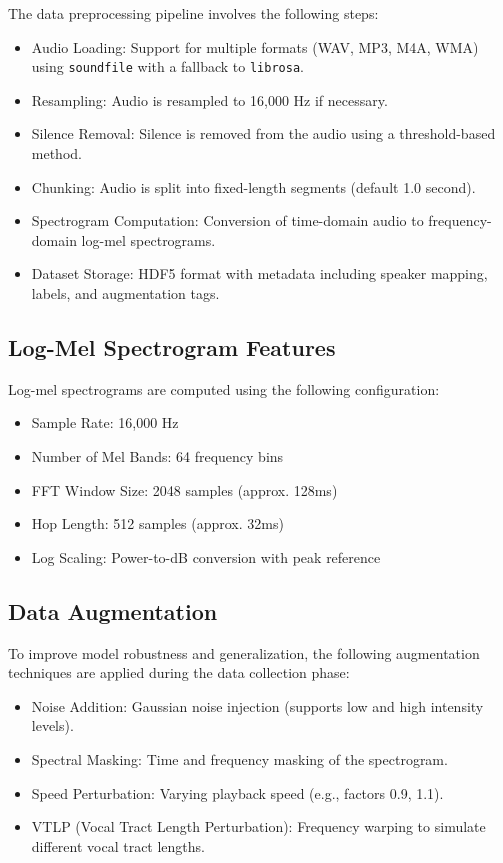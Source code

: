 \documentclass[12pt,a4paper]{article}
\begin{document}
The data preprocessing pipeline involves the following steps:

\begin{itemize}
\item Audio Loading: Support for multiple formats (WAV, MP3, M4A, WMA) using \texttt{soundfile} with a fallback to \texttt{librosa}.
\item Resampling: Audio is resampled to 16,000 Hz if necessary.
\item Silence Removal: Silence is removed from the audio using a threshold-based method.
\item Chunking: Audio is split into fixed-length segments (default 1.0 second).
\item Spectrogram Computation: Conversion of time-domain audio to frequency-domain log-mel spectrograms.
\item Dataset Storage: HDF5 format with metadata including speaker mapping, labels, and augmentation tags.
\end{itemize}

\subsection{Log-Mel Spectrogram Features}

Log-mel spectrograms are computed using the following configuration:
\begin{itemize}
\item Sample Rate: 16,000 Hz
\item Number of Mel Bands: 64 frequency bins
\item FFT Window Size: 2048 samples (approx. 128ms)
\item Hop Length: 512 samples (approx. 32ms)
\item Log Scaling: Power-to-dB conversion with peak reference
\end{itemize}

\subsection{Data Augmentation}

To improve model robustness and generalization, the following augmentation techniques are applied during the data collection phase:

\begin{itemize}
\item Noise Addition: Gaussian noise injection (supports low and high intensity levels).
\item Spectral Masking: Time and frequency masking of the spectrogram.
\item Speed Perturbation: Varying playback speed (e.g., factors 0.9, 1.1).
\item VTLP (Vocal Tract Length Perturbation): Frequency warping to simulate different vocal tract lengths.
\end{itemize}
\end{document}
